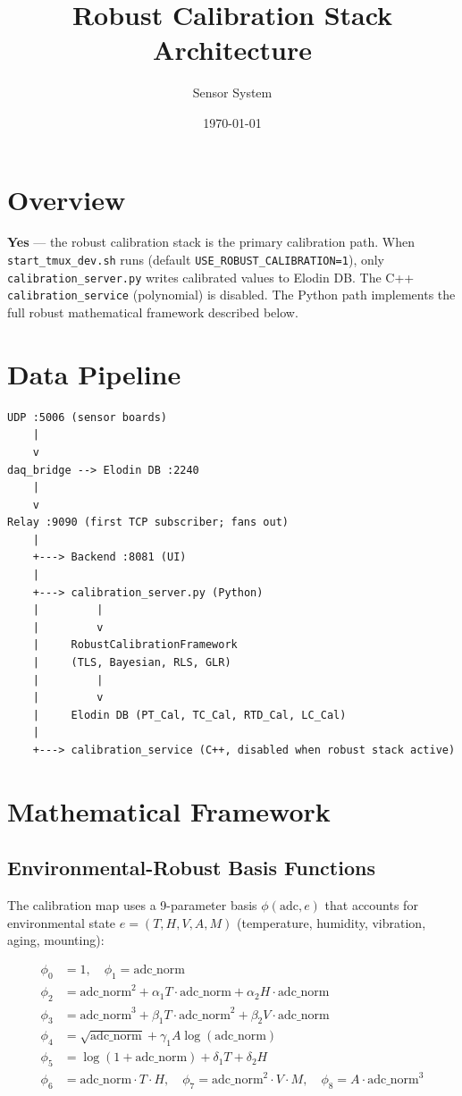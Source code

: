 \documentclass[11pt]{article}
\title{Robust Calibration Stack Architecture}
\author{Sensor System}
\date{\today}
\begin{document}
\maketitle

\section{Overview}

\textbf{Yes} — the robust calibration stack is the primary calibration path. When \texttt{start\_tmux\_dev.sh} runs (default \texttt{USE\_ROBUST\_CALIBRATION=1}), only \texttt{calibration\_server.py} writes calibrated values to Elodin DB. The C++ \texttt{calibration\_service} (polynomial) is disabled. The Python path implements the full robust mathematical framework described below.

\section{Data Pipeline}

\begin{verbatim}
UDP :5006 (sensor boards)
    |
    v
daq_bridge --> Elodin DB :2240
    |
    v
Relay :9090 (first TCP subscriber; fans out)
    |
    +---> Backend :8081 (UI)
    |
    +---> calibration_server.py (Python)
    |         |
    |         v
    |     RobustCalibrationFramework
    |     (TLS, Bayesian, RLS, GLR)
    |         |
    |         v
    |     Elodin DB (PT_Cal, TC_Cal, RTD_Cal, LC_Cal)
    |
    +---> calibration_service (C++, disabled when robust stack active)
\end{verbatim}

\section{Mathematical Framework}

\subsection{Environmental-Robust Basis Functions}

The calibration map uses a 9-parameter basis $\phi(\text{adc}, e)$ that accounts for environmental state $e = (T, H, V, A, M)$ (temperature, humidity, vibration, aging, mounting):

\begin{align}
\phi_0 &= 1, \quad \phi_1 = \text{adc\_norm} \\
\phi_2 &= \text{adc\_norm}^2 + \alpha_1 T \cdot \text{adc\_norm} + \alpha_2 H \cdot \text{adc\_norm} \\
\phi_3 &= \text{adc\_norm}^3 + \beta_1 T \cdot \text{adc\_norm}^2 + \beta_2 V \cdot \text{adc\_norm} \\
\phi_4 &= \sqrt{\text{adc\_norm}} + \gamma_1 A \log(\text{adc\_norm}) \\
\phi_5 &= \log(1 + \text{adc\_norm}) + \delta_1 T + \delta_2 H \\
\phi_6 &= \text{adc\_norm} \cdot T \cdot H, \quad
\phi_7 = \text{adc\_norm}^2 \cdot V \cdot M, \quad
\phi_8 = A \cdot \text{adc\_norm}^3
\end{align}
\end{document}
